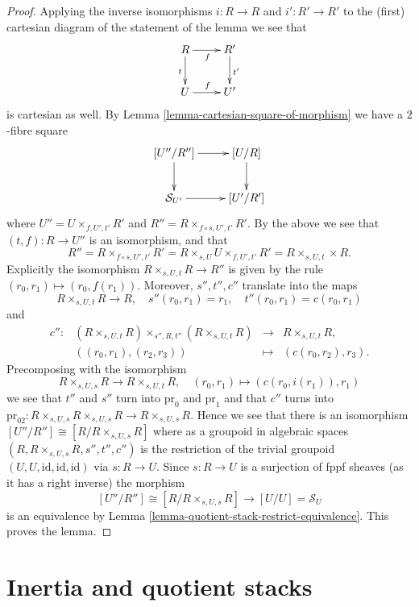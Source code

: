 \begin{proof}
Applying the inverse isomorphisms $i : R \to R$ and $i' : R' \to R'$
to the (first) cartesian diagram of the statement of the lemma we see
that
$$
\xymatrix{
R \ar[d]_t \ar[r]_f & R' \ar[d]^{t'} \\
U \ar[r]^f & U'
}
$$
is cartesian as well. By
Lemma \ref{lemma-cartesian-square-of-morphism}
we have a $2$-fibre square
$$
\xymatrix{
[U''/R''] \ar[d] \ar[r] & [U/R] \ar[d] \\
\mathcal{S}_{U'} \ar[r] & [U'/R']
}
$$
where $U'' = U \times_{f, U', t'} R'$ and
$R'' = R \times_{f \circ s, U', t'} R'$. By the above
we see that $(t, f) : R \to U''$ is an isomorphism, and that
$$
R'' =
R \times_{f \circ s, U', t'} R' =
R \times_{s, U} U \times_{f, U', t'} R' =
R \times_{s, U, t} \times R.
$$
Explicitly the isomorphism $R \times_{s, U, t} R \to R''$ is given by
the rule $(r_0, r_1) \mapsto (r_0, f(r_1))$.
Moreover, $s'', t'', c''$ translate into the maps
$$
R \times_{s, U, t} R \to R,
\quad
s''(r_0, r_1) = r_1, \quad t''(r_0, r_1) = c(r_0, r_1)
$$
and
$$
\begin{matrix}
c'' : &
(R \times_{s, U, t} R) \times_{s'', R, t''} (R \times_{s, U, t} R)
&
\longrightarrow
&
R \times_{s, U, t} R,\\
&
((r_0, r_1), (r_2, r_3)) &
\longmapsto & (c(r_0, r_2), r_3).
\end{matrix}
$$
Precomposing with the isomorphism
$$
R \times_{s, U, s} R \longrightarrow R \times_{s, U, t} R,
\quad
(r_0, r_1) \longmapsto (c(r_0, i(r_1)), r_1)
$$
we see that $t''$ and $s''$ turn into
$\text{pr}_0$ and $\text{pr}_1$ and that $c''$ turns into
$\text{pr}_{02} :
R \times_{s, U, s} R \times_{s, U, s} R \to R \times_{s, U, s} R$.
Hence we see that there is an isomorphism
$[U''/R''] \cong [R/R \times_{s, U, s} R]$ where as a groupoid
in algebraic spaces $(R, R \times_{s, U, s} R, s'', t'', c'')$
is the restriction of the trivial groupoid
$(U, U, \text{id}, \text{id}, \text{id})$ via $s : R \to U$.
Since $s : R \to U$ is a surjection of fppf sheaves (as it has a
right inverse) the morphism
$$
[U''/R''] \cong [R/R \times_{s, U, s} R]
\longrightarrow
[U/U] = \mathcal{S}_U
$$
is an equivalence by
Lemma \ref{lemma-quotient-stack-restrict-equivalence}.
This proves the lemma.
\end{proof}





\section{Inertia and quotient stacks}
\label{section-inertia}

